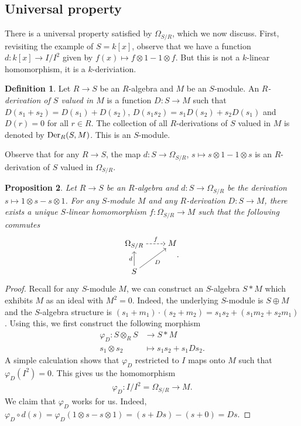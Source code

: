 \documentclass[letterpaper,10pt,twoside]{amsart}
\newcommand{\tens}{\otimes}
\DeclareMathOperator{\Der}{\text{\rm Der}}
\theoremstyle{proposition}
\newtheorem{proposition}{Proposition}[section]
\theoremstyle{definition}
\newtheorem{definition}[proposition]{Definition}
\theoremstyle{theorem}
\theoremstyle{definition}
\theoremstyle{definition}
\theoremstyle{definition}
\theoremstyle{lemma}
\theoremstyle{definition}
\theoremstyle{definition}
\theoremstyle{corollary}
\theoremstyle{definition}
\begin{document}
	\subsection{Universal property}
	There is a universal property satisfied by $\Omega_{S/R}$, which we now discuss. First, revisiting the example of $S=k[x]$, observe that we have a function $d : k[x]\longrightarrow I/I^{2}$ given by $f(x)\mapsto f\tens 1 - 1\tens f$. But this is not a $k$-linear homomorphism, it is a $k$-deriviation.
	\begin{definition}
		Let $R \to S$ be an $R$-algebra and $M$ be an $S$-module. An \textit{$R$-derivation of $S$ valued in $M$} is a function $D : S\to M$ such that $D(s_1 + s_2) = D(s_1) + D(s_2)$, $D(s_1s_2) = s_1D(s_2) + s_2D(s_1)$ and $D(r) = 0$ for all $r\in R$. The collection of all $R$-derivations of $S$ valued in $M$ is denoted by $\Der_{R}(S,M)$. This is an $S$-module.
	\end{definition}
	Observe that for any $R\to S$, the map $d : S \to \Omega_{S/R}$, $s\mapsto s\tens 1 - 1\tens s$ is an $R$-derivation of $S$ valued in $\Omega_{S/R}$. 
	\begin{proposition}
		Let $R\to S$ be an $R$-algebra and $d : S \to \Omega_{S/R}$ be the derivation $s\mapsto 1\tens s - s\tens 1$. For any $S$-module $M$ and any $R$-derivation $D :S\to M$, there exists a unique $S$-linear homomorphism $f : \Omega_{S/R} \to M$ such that the following commutes
		\[\begin{tikzcd}[cramped]
			{\Omega_{S/R}} & M \\
			S
			\arrow["f", dashed, from=1-1, to=1-2]
			\arrow["d", from=2-1, to=1-1]
			\arrow["D"', from=2-1, to=1-2]
		\end{tikzcd}.\]
	\end{proposition}
	\begin{proof}
		Recall for any $S$-module $M$, we can construct an $S$-algebra $S*M$ which exhibits $M$ as an ideal with $M^{2} = 0$. Indeed, the underlying $S$-module is $S\oplus M$ and the $S$-algebra structure is $(s_1+m_1) \cdot (s_2+m_2) = s_1s_2 + (s_1m_2 + s_2m_1)$. Using this, we first construct the following morphism 
		\begin{align*}
			\varphi_{D} : S\tens_{R} S &\longrightarrow S*M\\
								s_1\tens s_2 &\longmapsto s_1s_2 + s_1Ds_2.
		\end{align*} 
		A simple calculation shows that $\varphi_{D}$ restricted to $I$ maps onto $M$ such that $\varphi_{D}(I^{2}) = 0$. This gives us the homomorphism 
		\begin{align*}
			\varphi_{D} : I/I^{2} = \Omega_{S/R} \longrightarrow M.
		\end{align*}
		We claim that $\varphi_{D}$ works for us. Indeed, $\varphi_{D}\circ d(s) = \varphi_{D} (1\tens s - s\tens 1) = (s+Ds) - (s+0) = Ds$. 
	\end{proof}
\end{document}

